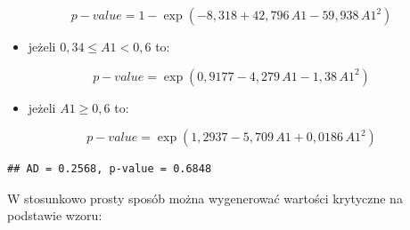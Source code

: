 \documentclass[polish,]{book}
\newenvironment{Shaded}{\begin{snugshade}}{\end{snugshade}}
\newcommand{\BuiltInTok}[1]{#1}
\newcommand{\DecValTok}[1]{\textcolor[rgb]{0.00,0.00,0.81}{#1}}
\newcommand{\FloatTok}[1]{\textcolor[rgb]{0.00,0.00,0.81}{#1}}
\newcommand{\ImportTok}[1]{#1}
\newcommand{\NormalTok}[1]{#1}
\newcommand{\OperatorTok}[1]{\textcolor[rgb]{0.81,0.36,0.00}{\textbf{#1}}}
\newcommand{\SpecialCharTok}[1]{\textcolor[rgb]{0.00,0.00,0.00}{#1}}
\newcommand{\StringTok}[1]{\textcolor[rgb]{0.31,0.60,0.02}{#1}}
\providecommand{\tightlist}{%
  \setlength{\itemsep}{0pt}\setlength{\parskip}{0pt}}
\begin{document}
\begin{equation}
p-value=1-\exp(-8,318+42,796\,A1-59,938\,A1^2)
\label{eq:v08b}
\end{equation}

\begin{itemize}
\tightlist
\item
  jeżeli \(0,34\leq A1 < 0,6\) to:
\end{itemize}

\begin{equation}
p-value=\exp(0,9177-4,279\,A1-1,38\,A1^2)
\label{eq:v08c}
\end{equation}

\begin{itemize}
\tightlist
\item
  jeżeli \(A1\geq 0,6\) to:
\end{itemize}

\begin{equation}
p-value= \exp(1,2937-5,709\,A1+0,0186\,A1^2)
\label{eq:v08d}
\end{equation}

\begin{Shaded}
\end{Shaded}

\begin{verbatim}
## AD = 0.2568, p-value = 0.6848
\end{verbatim}

W stosunkowo prosty sposób można wygenerować wartości krytyczne na podstawie wzoru:
\end{document}
